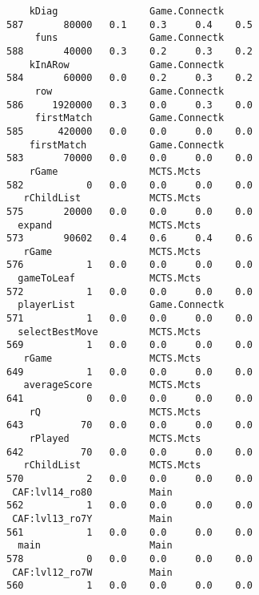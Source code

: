 \begin{tiny}
\begin{verbatim}
    kDiag                Game.Connectk                                        587       80000   0.1    0.3     0.4    0.5
     funs                Game.Connectk                                        588       40000   0.3    0.2     0.3    0.2
    kInARow              Game.Connectk                                        584       60000   0.0    0.2     0.3    0.2
     row                 Game.Connectk                                        586     1920000   0.3    0.0     0.3    0.0
     firstMatch          Game.Connectk                                        585      420000   0.0    0.0     0.0    0.0
    firstMatch           Game.Connectk                                        583       70000   0.0    0.0     0.0    0.0
    rGame                MCTS.Mcts                                            582           0   0.0    0.0     0.0    0.0
   rChildList            MCTS.Mcts                                            575       20000   0.0    0.0     0.0    0.0
  expand                 MCTS.Mcts                                            573       90602   0.4    0.6     0.4    0.6
   rGame                 MCTS.Mcts                                            576           1   0.0    0.0     0.0    0.0
  gameToLeaf             MCTS.Mcts                                            572           1   0.0    0.0     0.0    0.0
  playerList             Game.Connectk                                        571           1   0.0    0.0     0.0    0.0
  selectBestMove         MCTS.Mcts                                            569           1   0.0    0.0     0.0    0.0
   rGame                 MCTS.Mcts                                            649           1   0.0    0.0     0.0    0.0
   averageScore          MCTS.Mcts                                            641           0   0.0    0.0     0.0    0.0
    rQ                   MCTS.Mcts                                            643          70   0.0    0.0     0.0    0.0
    rPlayed              MCTS.Mcts                                            642          70   0.0    0.0     0.0    0.0
   rChildList            MCTS.Mcts                                            570           2   0.0    0.0     0.0    0.0
 CAF:lvl14_ro80          Main                                                 562           1   0.0    0.0     0.0    0.0
 CAF:lvl13_ro7Y          Main                                                 561           1   0.0    0.0     0.0    0.0
  main                   Main                                                 578           0   0.0    0.0     0.0    0.0
 CAF:lvl12_ro7W          Main                                                 560           1   0.0    0.0     0.0    0.0

\end{verbatim}
\end{tiny}
